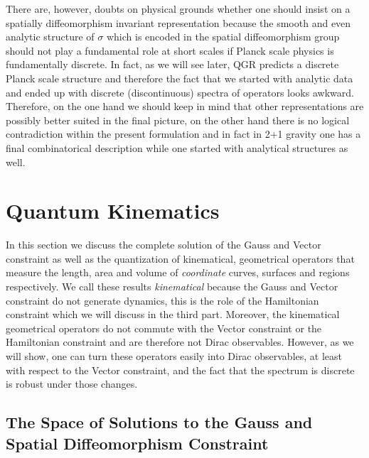 \documentclass[12pt]{report}
\begin{document}
There are, however, doubts on physical grounds whether one should insist 
on a spatially diffeomorphism invariant representation because the 
smooth and 
even analytic structure of $\sigma$ which is encoded in the spatial 
diffeomorphism group should not play a fundamental role at short scales
if Planck scale physics is fundamentally discrete. In fact, as we will 
see later, QGR predicts a discrete Planck scale structure and therefore 
the fact that we started with analytic data and ended up with discrete 
(discontinuous) spectra of operators looks awkward. Therefore, on the one 
hand we should keep in mind that other representations are possibly 
better suited in the final picture, on the other hand there is no logical 
contradiction within the present formulation and in fact in 2+1 gravity 
one has a final combinatorical description while one started with 
analytical structures as well.


\section{Quantum Kinematics}
\label{s2.2}

In this section we discuss the complete solution of the Gauss and Vector 
constraint as well as the quantization of kinematical, geometrical operators 
that measure the length, area and volume of {\it coordinate} curves, 
surfaces and regions respectively. We call these results {\it kinematical}
because the Gauss and Vector constraint do not generate dynamics, this 
is the role of the Hamiltonian constraint which we will discuss in the 
third part. Moreover, the kinematical geometrical operators do not
commute with the Vector constraint or the Hamiltonian constraint and are 
therefore not Dirac observables. However, as we will show, one can turn
these operators easily into Dirac observables, at least with respect to the 
Vector constraint, and the fact that the spectrum is discrete is robust under
those changes. 

\subsection{The Space of Solutions to the Gauss and Spatial
Diffeomorphism Constraint}
\label{s2.2.1}
\end{document}
